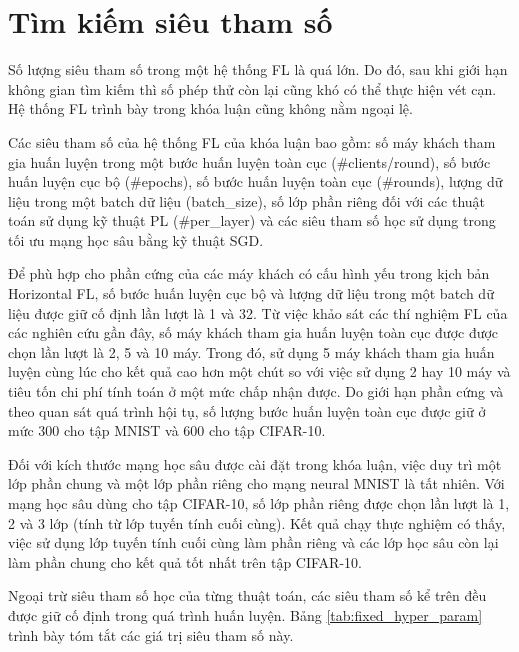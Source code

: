 \appendix

\chapter{Tìm kiếm siêu tham số}
\label{Appendix1}

Số lượng siêu tham số trong một hệ thống FL là quá lớn. Do đó, sau khi giới hạn không gian tìm kiếm thì số phép thử còn lại cũng khó có thể thực hiện vét cạn. Hệ thống FL trình bày trong khóa luận cũng không nằm ngoại lệ.

Các siêu tham số của hệ thống FL của khóa luận bao gồm: số máy khách tham gia huấn luyện trong một bước huấn luyện toàn cục (\#clients/round), số bước huấn luyện cục bộ (\#epochs), số bước huấn luyện toàn cục (\#rounds), lượng dữ liệu trong một batch dữ liệu (batch_size), số lớp phần riêng đối với các thuật toán sử dụng kỹ thuật PL (\#per_layer) và các siêu tham số học sử dụng trong tối ưu mạng học sâu bằng kỹ thuật SGD.

Để phù hợp cho phần cứng của các máy khách có cấu hình yếu trong kịch bản Horizontal FL, số bước huấn luyện cục bộ và lượng dữ liệu trong một batch dữ liệu được giữ cố định lần lượt là 1 và 32. Từ việc khảo sát các thí nghiệm FL của các nghiên cứu gần đây, số máy khách tham gia huấn luyện toàn cục được được chọn lần lượt là 2, 5 và 10 máy. Trong đó, sử dụng 5 máy khách tham gia huấn luyện cùng lúc cho kết quả cao hơn một chút so với việc sử dụng 2 hay 10 máy và tiêu tốn chi phí tính toán ở một mức chấp nhận được. Do giới hạn phần cứng và theo quan sát quá trình hội tụ, số lượng bước huấn luyện toàn cục được giữ ở mức 300 cho tập MNIST và 600 cho tập CIFAR-10.

Đối với kích thước mạng học sâu được cài đặt trong khóa luận, việc duy trì một lớp phần chung và một lớp phần riêng cho mạng neural MNIST là tất nhiên. Với mạng học sâu dùng cho tập CIFAR-10, số lớp phần riêng được chọn lần lượt là 1, 2 và 3 lớp (tính từ lớp tuyến tính cuối cùng). Kết quả chạy thực nghiệm có thấy, việc sử dụng lớp tuyến tính cuối cùng làm phần riêng và các lớp học sâu còn lại làm phần chung cho kết quả tốt nhất trên tập CIFAR-10.

Ngoại trừ siêu tham số học của từng thuật toán, các siêu tham số kể trên đều được giữ cố định trong quá trình huấn luyện. Bảng \ref{tab:fixed_hyper_param} trình bày tóm tắt các giá trị siêu tham số này.

